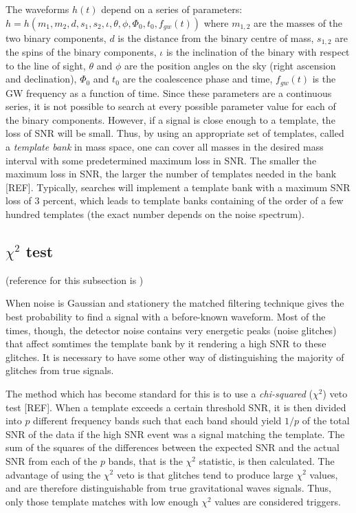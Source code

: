 \documentclass[epsf]{article}
\begin{document}
The waveforms $h(t)$ depend on a series of parameters: $h=h(m_1,m_2,d,s_1,s_2, \iota, \theta, \phi, \Phi_0, t_0,f_{gw}(t))$ where $m_{1,2}$ are the masses of the two binary components, $d$ is the distance from the binary centre of mass, $s_{1,2}$ are the spins of the binary components, $\iota$ is the inclination of the binary with respect to the line of sight, $\theta$ and $\phi$ are the position angles on the sky (right ascension and declination), $\Phi_0$ and $t_0$ are the coalescence phase and time, $f_{gw}(t)$ is the GW frequency as a function of time. Since these parameters are a continuous series, it is not possible to search at every possible parameter value for each of the
binary components. However, if a signal is close enough to a template, the loss of SNR will be small. Thus, by using an appropriate set of
templates, called a \emph{template bank} in mass space, one can cover all masses in the
desired mass interval with some predetermined maximum loss in SNR. The smaller the maximum loss in SNR, the
larger the number of templates needed in the bank [REF]. Typically, searches will
implement a template bank with a maximum SNR loss of 3 percent, which leads to
template banks containing of the order of a few hundred templates (the exact
number depends on the noise spectrum).

\subsection{$\chi^2$ test}(reference for this subsection is \cite{allen,maggiore,cre}) 

When noise is Gaussian and stationery the matched filtering technique gives the best probability to find a signal with a before-known waveform. Most of the times, though, the detector noise contains very energetic peaks (noise glitches) that affect somtimes the template bank by it rendering a high SNR to these glitches. It is necessary to have some other way of distinguishing the majority of glitches from true signals.

The method which has become standard for this is to use a \emph{chi-squared}
(${\chi}^2$) veto test [REF]. When a template exceeds a certain threshold SNR, 
it is then divided into $p$ different frequency bands such
that each band should yield $1/p$ of the total SNR of the data if the high SNR
event was a signal matching the template. The sum of the squares of the
differences between the expected SNR and the actual SNR from each of the $p$
bands, that is the ${\chi}^2$ statistic, is then calculated. The advantage of
using the ${\chi}^2$ veto is that glitches tend to produce large ${\chi}^2$ values, 
and are therefore distinguishable from true gravitational waves
signals. Thus, only those template matches with low enough ${\chi}^2$ values
are considered triggers. 
\end{document}
